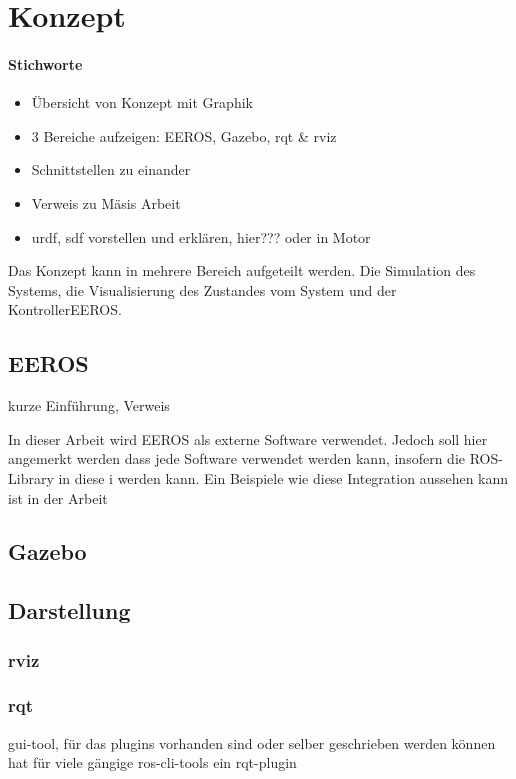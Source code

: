 \chapter{Konzept}
\subsubsection*{Stichworte}
\begin{itemize}
\item Übersicht von Konzept mit Graphik
\item 3 Bereiche aufzeigen: EEROS, Gazebo, rqt \& rviz
\item Schnittstellen zu einander
\item Verweis zu Mäsis Arbeit
\item urdf, sdf vorstellen und erklären, hier??? oder in Motor
\end{itemize}

Das Konzept kann in mehrere Bereich aufgeteilt werden.
Die Simulation des Systems, die Visualisierung des Zustandes vom System und der KontrollerEEROS.



\section{EEROS}
kurze Einführung, Verweis

In dieser Arbeit wird EEROS als externe Software verwendet.
Jedoch soll hier angemerkt werden dass jede Software verwendet werden kann, insofern die ROS-Library in diese i werden kann.
Ein Beispiele wie diese Integration aussehen kann ist in der Arbeit %


\section{Gazebo}

\section{Darstellung}
\subsection{rviz}
\subsection{rqt}
gui-tool, für das plugins vorhanden sind oder selber geschrieben werden können
hat für viele gängige ros-cli-tools ein rqt-plugin


